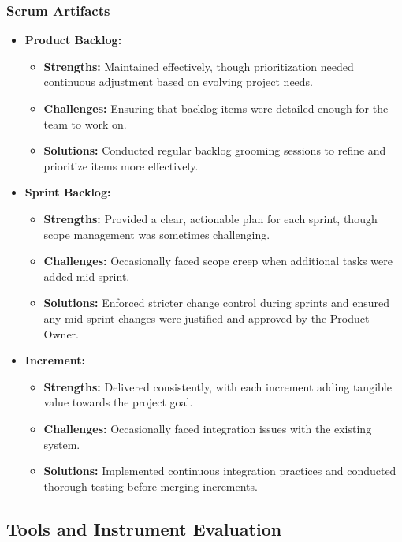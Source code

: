\documentclass[11pt,a4paper]{article}
\begin{document}
    \subsubsection{Scrum Artifacts}\label{subsubsec:scrum-artifacts}
    \begin{itemize}
        \item \textbf{Product Backlog:}
        \begin{itemize}
            \item \textbf{Strengths:} Maintained effectively, though prioritization needed continuous adjustment based on evolving project needs.
            \item \textbf{Challenges:} Ensuring that backlog items were detailed enough for the team to work on.
            \item \textbf{Solutions:} Conducted regular backlog grooming sessions to refine and prioritize items more effectively.
        \end{itemize}
        \item \textbf{Sprint Backlog:}
        \begin{itemize}
            \item \textbf{Strengths:} Provided a clear, actionable plan for each sprint, though scope management was sometimes challenging.
            \item \textbf{Challenges:} Occasionally faced scope creep when additional tasks were added mid-sprint.
            \item \textbf{Solutions:} Enforced stricter change control during sprints and ensured any mid-sprint changes were justified and approved by the Product Owner.
        \end{itemize}
        \item \textbf{Increment:}
        \begin{itemize}
            \item \textbf{Strengths:} Delivered consistently, with each increment adding tangible value towards the project goal.
            \item \textbf{Challenges:} Occasionally faced integration issues with the existing system.
            \item \textbf{Solutions:} Implemented continuous integration practices and conducted thorough testing before merging increments.
        \end{itemize}
    \end{itemize}

    \subsection{Tools and Instrument Evaluation}\label{subsec:tools-instrument-evaluation}
\end{document}
